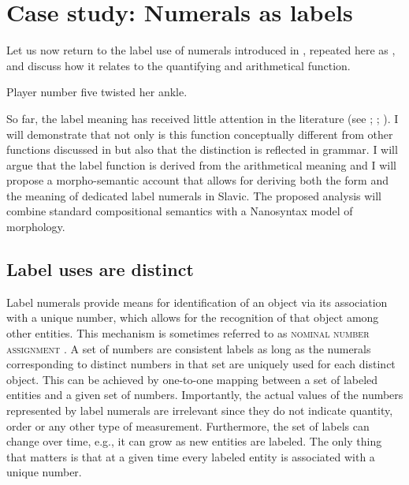 \documentclass[output=paper]{langscibook}
\begin{document}
	\section{Case study: Numerals as labels}\label{sec:case-study-numerals-as-labels}

Let us now return to the label use of numerals introduced in , repeated here as , and discuss how it relates to the quantifying and arithmetical function.
 	
	\ea	Player number five twisted her ankle.\label{ex:uses-label-1}
	\z
	
	\noindent So far, the label meaning has received little attention in the literature (see \citealt[167--168]{hurford1987language}; \citealt[37--42]{wiese2003numbers}; \citealt[119--129]{bultinck2005numerous}). I will demonstrate that not only is this function conceptually different from other functions discussed in  but also that the distinction is reflected in grammar. I will argue that the label function is derived from the arithmetical meaning and I will propose a morpho-semantic account that allows for deriving both the form and the meaning of dedicated label numerals in Slavic. The proposed analysis will combine standard compositional semantics with a Nanosyntax model of morphology.

    \subsection{Label uses are distinct}\label{sec:label-uses-are-distinct}
	
 Label numerals provide means for identification of an object via its association with a unique number, which allows for the recognition of that object among other entities. This mechanism is sometimes referred to as \textsc{nominal number assignment} \citep[37--38]{wiese2003numbers}. A set of numbers are consistent labels as long as the numerals corresponding to distinct numbers in that set are uniquely used for each distinct object. This can be achieved by one-to-one mapping between a set of labeled entities and a given set of numbers. Importantly, the actual values of the numbers represented by label numerals are irrelevant since they do not indicate quantity, order or any other type of measurement. Furthermore, the set of labels can change over time, e.g., it can grow as new entities are labeled. The only thing that matters is that at a given time every labeled entity is associated with a unique number.
\end{document}
